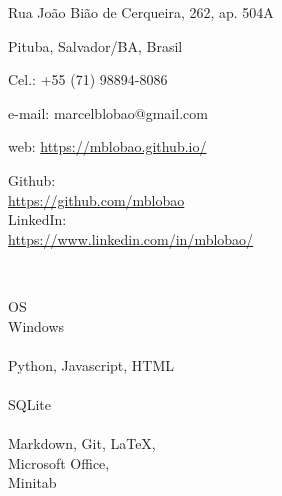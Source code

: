 \documentclass{cv}
\author{Marcel Britto Lobão}  %
\begin{document}
    \begin{minipage}[t]{0.6\textwidth}
        \name
        
        \vspace{6pt}
        \normalsize{}
    \end{minipage}
    \hfill
    \begin{minipage}[t]{0.6\textwidth}  %
        Rua João Bião de Cerqueira, 262, ap. 504A
        
        Pituba, Salvador/BA, Brasil
        
        Cel.: +55 (71) 98894-8086
        
        e-mail: marcelblobao@gmail.com

        web: \href{https://mblobao.github.io/}{https://mblobao.github.io/}
    \end{minipage}

    \begin{minipage}[t]{0.3\textwidth}
            Github:\\ \href{https://github.com/mblobao}{https://github.com/mblobao}\\
            LinkedIn:\\ \href{https://www.linkedin.com/in/mblobao/}{https://www.linkedin.com/in/mblobao/}
            
            \\
        
            OS\\
            Windows
            \vspace{2mm}
            \\\\
            Python, Javascript, HTML
            \vspace{2mm}
            \\\\
            SQLite
            \vspace{2mm}
            \\\\
            Markdown, Git, LaTeX,\\
            Microsoft Office,\\
            Minitab
        
        
    \end{minipage}
    \hfill
    \begin{minipage}[t]{0.65\textwidth} 
    
        
        
        
    \end{minipage}
\end{document}
